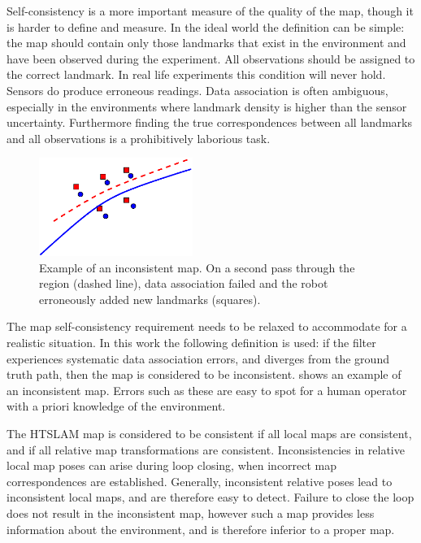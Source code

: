 Self-consistency is a more important measure of the quality of the
map, though it is harder to define and measure. In the ideal world the
definition can be simple: the map should contain only those landmarks
that exist in the environment and have been observed during the
experiment. All observations should be assigned to the correct
landmark. In real life experiments this condition will never hold.
Sensors do produce erroneous readings. Data association is often
ambiguous, especially in the environments where landmark density is
higher than the sensor uncertainty. Furthermore finding the true
correspondences between all landmarks and all observations is a
prohibitively laborious task.

\begin{figure}[htbp]
  \centering
  \includegraphics[width=5cm]{Pics/fig_inconsistent_map}
  \caption[Example of an inconsistent map]
  {Example of an inconsistent map. On a second pass through
    the region (dashed line), data association failed and the robot
    erroneously added new landmarks (squares).}
  \label{fig:inconsistent_map}
\end{figure}


The map self-consistency requirement needs to be relaxed to
accommodate for a realistic situation. In this work the following
definition is used: if the filter experiences systematic data
association errors, and diverges from the ground truth path, then the
map is considered to be inconsistent. 
shows an example of an inconsistent map. Errors such as these are easy
to spot for a human operator with a priori knowledge of the
environment.

The HTSLAM map is considered to be consistent if all local maps are
consistent, and if all relative map transformations are consistent.
Inconsistencies in relative local map poses can arise during loop
closing, when incorrect map correspondences are established.
Generally, inconsistent relative poses lead to inconsistent local
maps, and are therefore easy to detect. Failure to close the loop does
not result in the inconsistent map, however such a map provides less
information about the environment, and is therefore inferior to a
proper map.

